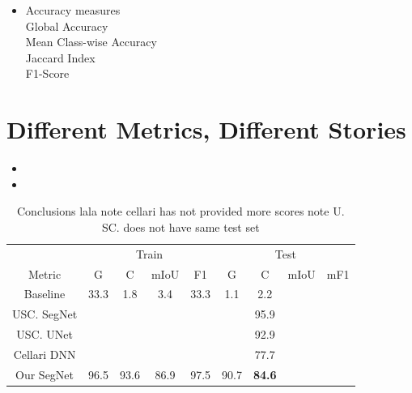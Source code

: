 \documentclass[
]{dtuposter}
\begin{document}
\begin{dtupostercontent}
\begin{itemize}
	\item Accuracy measures \\
		Global Accuracy \\
		Mean Class-wise Accuracy \\
		Jaccard Index \\
		F1-Score
\end{itemize}

\section{Different Metrics, Different Stories}

\begin{itemize}
	\item 
	
	\item 
\end{itemize}

\begin{table}
	\begin{tabular}{c|cccc|cccc|}
		
		\rule[-1ex]{0pt}{2.5ex}  & \multicolumn{4}{c|}{Train} &  \multicolumn{4}{c|}{Test} \\ 
		
		\rule[-1ex]{0pt}{2.5ex} Metric  & G & C &mIoU&  F1 & G & C & mIoU& mF1 \\ 
		\hline
		\rule[-1ex]{0pt}{2.5ex} Baseline&  33.3 &1.8  &3.4  &33.3  &1.1  &2.2  \\ 
		
		\rule[-1ex]{0pt}{2.5ex} USC. SegNet    &  &  &  &  &  &95.9  \\ 
		\rule[-1ex]{0pt}{2.5ex} USC. UNet   &  &  &  &  &  &92.9  \\ 
		\rule[-1ex]{0pt}{2.5ex} Cellari DNN   &  &  &  &  &  &77.7  \\ 
		\hline 
		\rule[-1ex]{0pt}{2.5ex} Our SegNet & 96.5&93.6  & 86.9 &97.5  & 90.7  &\textbf{84.6}  \\ 
	\end{tabular} 
\caption{Conclusions lala note cellari has not provided more scores note U. SC. does not have same test set}
\end{table}





\end{dtupostercontent}
\end{document}
